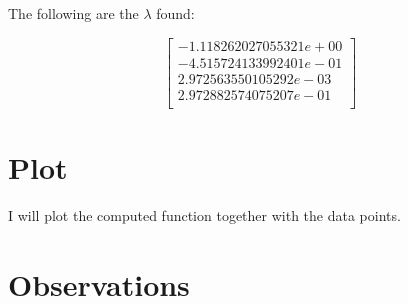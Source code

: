 \documentclass{article}
\begin{document}
The following are the $\lambda$ found:

$$
\begin{bmatrix}
-1.118262027055321e+00\\
-4.515724133992401e-01\\
2.972563550105292e-03\\
2.972882574075207e-01\\
\end{bmatrix}
$$

\section{Plot}
I will plot the computed function together with the data points.
\section{Observations}
\end{document}
